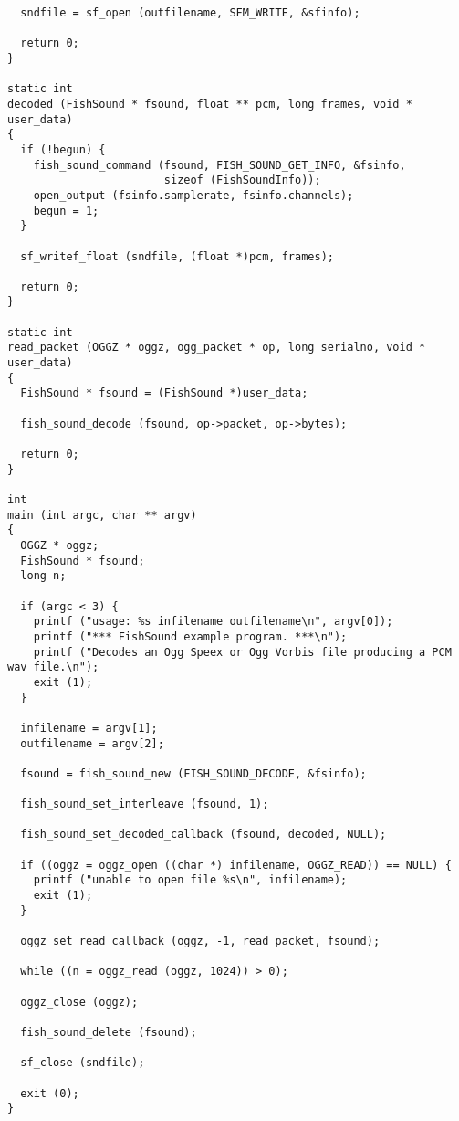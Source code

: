 \begin{verbatim}
  sndfile = sf_open (outfilename, SFM_WRITE, &sfinfo);

  return 0;
}

static int
decoded (FishSound * fsound, float ** pcm, long frames, void * user_data)
{
  if (!begun) {
    fish_sound_command (fsound, FISH_SOUND_GET_INFO, &fsinfo,
                        sizeof (FishSoundInfo));
    open_output (fsinfo.samplerate, fsinfo.channels);
    begun = 1;
  }

  sf_writef_float (sndfile, (float *)pcm, frames);

  return 0;
}

static int
read_packet (OGGZ * oggz, ogg_packet * op, long serialno, void * user_data)
{
  FishSound * fsound = (FishSound *)user_data;

  fish_sound_decode (fsound, op->packet, op->bytes);

  return 0;
}

int
main (int argc, char ** argv)
{
  OGGZ * oggz;
  FishSound * fsound;
  long n;

  if (argc < 3) {
    printf ("usage: %s infilename outfilename\n", argv[0]);
    printf ("*** FishSound example program. ***\n");
    printf ("Decodes an Ogg Speex or Ogg Vorbis file producing a PCM wav file.\n");
    exit (1);
  }

  infilename = argv[1];
  outfilename = argv[2];

  fsound = fish_sound_new (FISH_SOUND_DECODE, &fsinfo);

  fish_sound_set_interleave (fsound, 1);

  fish_sound_set_decoded_callback (fsound, decoded, NULL);

  if ((oggz = oggz_open ((char *) infilename, OGGZ_READ)) == NULL) {
    printf ("unable to open file %s\n", infilename);
    exit (1);
  }

  oggz_set_read_callback (oggz, -1, read_packet, fsound);

  while ((n = oggz_read (oggz, 1024)) > 0);

  oggz_close (oggz);

  fish_sound_delete (fsound);
  
  sf_close (sndfile);

  exit (0);
}

\end{verbatim}
\normalsize
 
